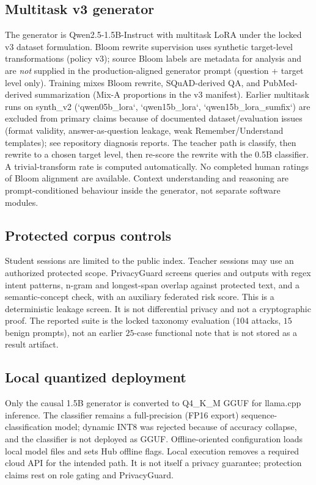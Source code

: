 \documentclass[journal]{IEEEtran}
\begin{document}
\subsection{Multitask v3 generator}
The generator is Qwen2.5-1.5B-Instruct with multitask LoRA under the locked v3 dataset formulation.
Bloom rewrite supervision uses synthetic target-level transformations (policy v3); source Bloom labels are metadata for analysis and are \emph{not} supplied in the production-aligned generator prompt (question + target level only).
Training mixes Bloom rewrite, SQuAD-derived QA, and PubMed-derived summarization (Mix-A proportions in the v3 manifest).
Earlier multitask runs on synth\_v2 (`qwen05b_lora`, `qwen15b_lora`, `qwen15b_lora_sumfix`) are excluded from primary claims because of documented dataset/evaluation issues (format validity, answer-as-question leakage, weak Remember/Understand templates); see repository diagnosis reports.
The teacher path is classify, then rewrite to a chosen target level, then re-score the rewrite with the 0.5B classifier.
A trivial-transform rate is computed automatically.
No completed human ratings of Bloom alignment are available.
Context understanding and reasoning are prompt-conditioned behaviour inside the generator, not separate software modules.

\subsection{Protected corpus controls}
Student sessions are limited to the public index.
Teacher sessions may use an authorized protected scope.
PrivacyGuard screens queries and outputs with regex intent patterns, n-gram and longest-span overlap against protected text, and a semantic-concept check, with an auxiliary federated risk score.
This is a deterministic leakage screen.
It is not differential privacy and not a cryptographic proof.
The reported suite is the locked taxonomy evaluation ($104$ attacks, $15$ benign prompts), not an earlier $25$-case functional note that is not stored as a result artifact.

\subsection{Local quantized deployment}
Only the causal 1.5B generator is converted to Q4\_K\_M GGUF for llama.cpp inference.
The classifier remains a full-precision (FP16 export) sequence-classification model; dynamic INT8 was rejected because of accuracy collapse, and the classifier is not deployed as GGUF.
Offline-oriented configuration loads local model files and sets Hub offline flags.
Local execution removes a required cloud API for the intended path.
It is not itself a privacy guarantee; protection claims rest on role gating and PrivacyGuard.
\end{document}
